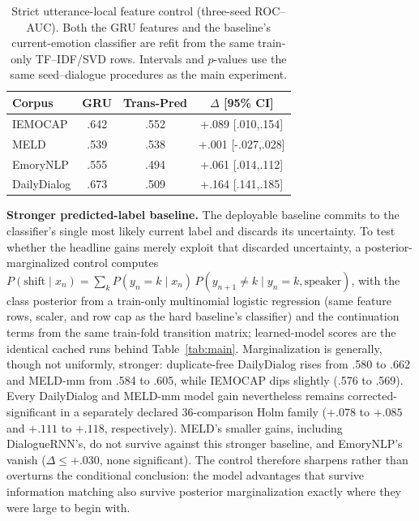 \documentclass{ieeeaccess}
\begin{document}
\begin{table}[t]
\centering
\footnotesize
\caption{Strict utterance-local feature control (three-seed ROC--AUC). Both the GRU features and
the baseline's current-emotion classifier are refit from the same train-only TF--IDF/SVD rows.
Intervals and $p$-values use the same seed--dialogue procedures as the main experiment.}
\label{tab:feat}
\begin{tabular}{lccc}
\toprule
Corpus & GRU & Trans-Pred & $\Delta$ [95\% CI] \\
\midrule
IEMOCAP     & .642 & .552 & +.089 [.010,.154] \\
MELD        & .539 & .538 & +.001 [-.027,.028] \\
EmoryNLP    & .555 & .494 & +.061 [.014,.112] \\
DailyDialog & .673 & .509 & +.164 [.141,.185] \\
\bottomrule
\end{tabular}
\end{table}

\textbf{Stronger predicted-label baseline.} The deployable baseline commits to the classifier's
single most likely current label and discards its uncertainty. To test whether the headline gains
merely exploit that discarded uncertainty, a posterior-marginalized control computes
$P(\mathrm{shift}\mid x_n)=\sum_k P(y_n{=}k\mid x_n)\,P(y_{n+1}{\neq}k\mid y_n{=}k,\text{speaker})$,
with the class posterior from a train-only multinomial logistic regression (same feature rows,
scaler, and row cap as the hard baseline's classifier) and the continuation terms from the same
train-fold transition matrix; learned-model scores are the identical cached runs behind
Table~\ref{tab:main}. Marginalization is generally, though not uniformly, stronger: duplicate-free
DailyDialog rises from .580 to .662 and MELD-mm from .584 to .605, while IEMOCAP dips slightly
(.576 to .569). Every DailyDialog and MELD-mm model gain nevertheless remains
corrected-significant in a separately declared 36-comparison Holm family ($+.078$ to $+.085$ and
$+.111$ to $+.118$, respectively). MELD's smaller gains, including DialogueRNN's, do not survive
against this stronger baseline, and EmoryNLP's vanish ($\Delta\leq+.030$, none significant). The
control therefore sharpens rather than overturns the conditional conclusion: the model advantages
that survive information matching also survive posterior marginalization exactly where they were
large to begin with.
\end{document}
